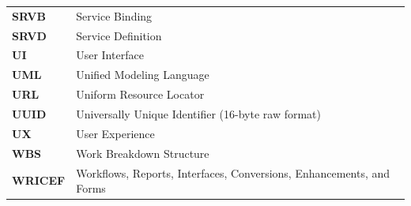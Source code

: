 \begin{longtable}{p{2.8cm} p{12cm}}
\textbf{SRVB} & Service Binding \\
\textbf{SRVD} & Service Definition \\
\textbf{UI} & User Interface \\
\textbf{UML} & Unified Modeling Language \\
\textbf{URL} & Uniform Resource Locator \\
\textbf{UUID} & Universally Unique Identifier (16-byte raw format) \\
\textbf{UX} & User Experience \\
\textbf{WBS} & Work Breakdown Structure \\
\textbf{WRICEF} & Workflows, Reports, Interfaces, Conversions, Enhancements, and Forms \\
\end{longtable}
\endgroup
